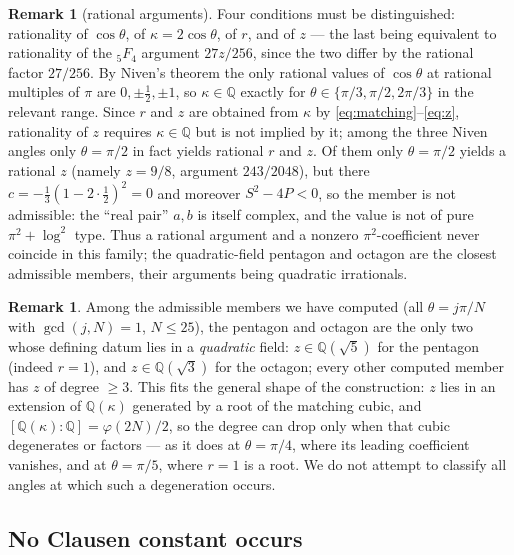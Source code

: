 \documentclass[11pt]{article}
\theoremstyle{definition}
\newtheorem{remark}[theorem]{Remark}
\newcommand{\Q}{\mathbb{Q}}
\begin{document}
\begin{remark}[rational arguments]
Four conditions must be distinguished: rationality of $\cos\theta$, of $\kappa=2\cos\theta$, of $r$,
and of $z$ --- the last being equivalent to rationality of the ${}_5F_4$ argument $27z/256$, since the
two differ by the rational factor $27/256$. By Niven's theorem the only rational values of
$\cos\theta$ at rational multiples of $\pi$ are $0,\pm\tfrac12,\pm1$, so $\kappa\in\Q$ exactly for
$\theta\in\{\pi/3,\pi/2,2\pi/3\}$ in the relevant range. Since $r$ and $z$ are obtained from $\kappa$
by \eqref{eq:matching}--\eqref{eq:z}, rationality of $z$ requires $\kappa\in\Q$ but is not implied by
it; among the three Niven angles only $\theta=\pi/2$ in fact yields rational $r$ and $z$. Of them only $\theta=\pi/2$ yields a rational $z$ (namely $z=9/8$, argument
$243/2048$), but there $c=-\tfrac13(1-2\cdot\tfrac12)^2=0$ and moreover $S^2-4P<0$, so the member is
not admissible: the ``real pair'' $a,b$ is itself complex, and the value is not of pure
$\pi^2+\log^2$ type. Thus a rational argument and a nonzero $\pi^2$-coefficient never coincide in this
family; the quadratic-field pentagon and octagon are the closest admissible members, their arguments
being quadratic irrationals.
\end{remark}

\begin{remark}
Among the admissible members we have computed (all $\theta=j\pi/N$ with $\gcd(j,N)=1$, $N\le25$),
the pentagon and octagon are the only two whose defining datum lies in a \emph{quadratic} field:
$z\in\Q(\sqrt5)$ for the pentagon (indeed $r=1$), and $z\in\Q(\sqrt3)$ for the octagon; every other
computed member has $z$ of degree $\ge3$. This fits the general shape of the construction: $z$ lies
in an extension of $\Q(\kappa)$ generated by a root of the matching cubic, and
$[\Q(\kappa):\Q]=\varphi(2N)/2$, so the degree can drop only when that cubic degenerates or factors
--- as it does at $\theta=\pi/4$, where its leading coefficient vanishes, and at $\theta=\pi/5$,
where $r=1$ is a root. We do not attempt to classify all angles at which such a degeneration
occurs.
\end{remark}

\subsection{No Clausen constant occurs}\label{sec:clausen}
\end{document}
